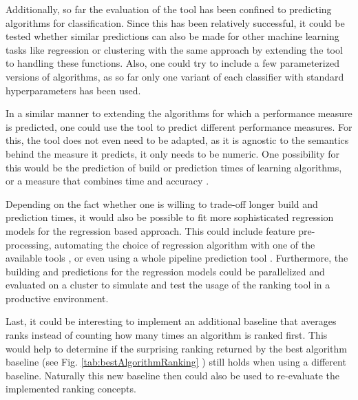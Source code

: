 Additionally, so far the evaluation of the tool has been confined to predicting algorithms for classification. Since this has been relatively successful, it could be tested whether similar predictions can also be made for other machine learning tasks like regression or clustering with the same approach by extending the tool to handling these functions. Also, one could try to include a few parameterized versions of algorithms, as so far only one variant of each classifier with standard hyperparameters has been used. 

In a similar manner to extending the algorithms for which a performance measure is predicted, one could use the tool to predict different performance measures. For this, the tool does not even need to be adapted, as it is agnostic to the semantics behind the measure it predicts, it only needs to be numeric. One possibility for this would be the prediction of build or prediction times of learning algorithms, or a measure that combines time and accuracy \cite{DBLP:journals/ml/AbdulrahmanBRV18}.

Depending on the fact whether one is willing to trade-off longer build and prediction times, it would also be possible to fit more sophisticated regression models for the regression based approach. This could include feature pre-processing, automating the choice of regression algorithm with one of the available tools \cite{thornton2013auto} \cite{feurer2015efficient}, or even using a whole pipeline prediction tool \cite{wever2017automatic} \cite{DBLP:conf/eurogp/SaPOP17}. Furthermore, the building and predictions for the regression models could be parallelized and evaluated on a cluster to simulate and test  the usage of the ranking tool in a productive environment.

Last, it could be interesting to implement an additional baseline that averages ranks instead of counting how many times an algorithm is ranked first. This would help to determine if the surprising ranking returned by the best algorithm baseline (see Fig. \ref{tab:bestAlgorithmRanking}
) still holds when using a different baseline. Naturally this new baseline then could also be used to re-evaluate the implemented ranking concepts. 


